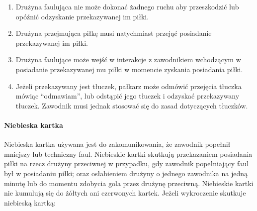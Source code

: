 \documentclass[12pt]{article}
\begin{document}
\begin{enumerate}
	      \begin{enumerate}
		      \item
		            Drużyna faulująca nie może dokonać żadnego ruchu aby przeszkodzić
		            lub opóźnić odzyskanie przekazywanej im piłki.
		      \item
		            Drużyna przejmująca piłkę musi natychmiast przejąć posiadanie
		            przekazywanej im piłki.
		      \item
		            Drużyna faulujące może wejść w interakcje z zawodnikiem wchodzącym w
		            posiadanie przekazywanej mu piłki w momencie zyskania posiadania
		            piłki.
		      \item
		            Jeżeli przekazywany jest tłuczek, pałkarz może odmówić przejęcia
		            tłuczka mówiąc ``odmawiam'', lub odstąpić jego tłuczek i odzyskać
		            przekazywany tłuczek. Zawodnik musi jednak stosować się do zasad
		            dotyczących tłuczków.
	      \end{enumerate}
\end{enumerate}

\paragraph{Niebieska kartka}
Niebieska kartka używana jest do
zakomunikowania, że zawodnik popełnił mniejszy lub techniczny faul.
Niebieskie kartki skutkują przekazaniem posiadania piłki na rzecz
drużyny przeciwnej w przypadku, gdy zawodnik popełniający faul był w
posiadaniu piłki; oraz osłabieniem drużyny o jednego zawodnika na jedną
minutę lub do momentu zdobycia gola przez drużynę przeciwną. Niebieskie
kartki nie kumulują się do żółtych ani czerwonych kartek. Jeżeli
wykroczenie skutkuje niebieską kartką:
\end{document}
